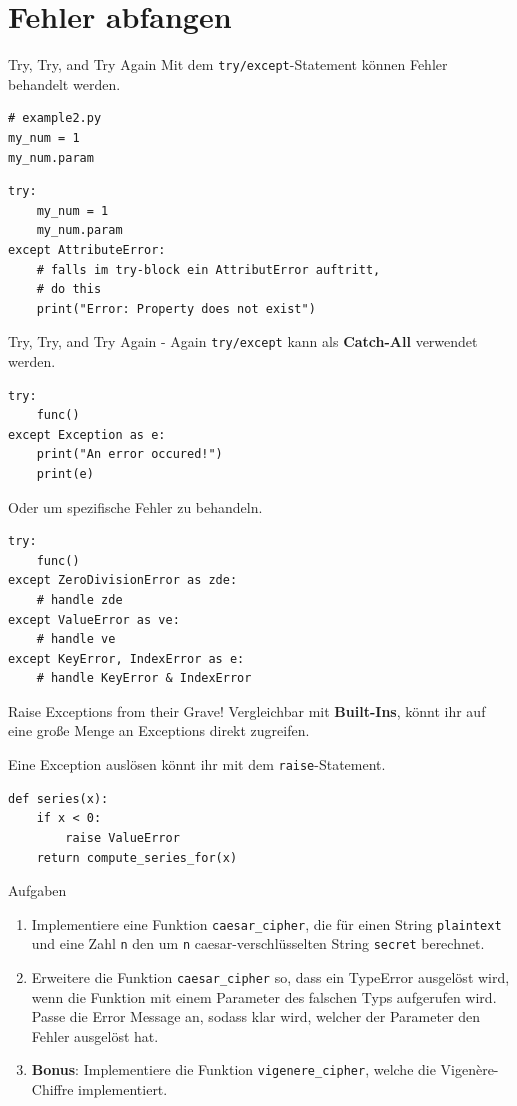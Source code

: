 \section{Fehler abfangen}

\begin{frame}[fragile]{Try, Try, and Try Again}
    Mit dem \texttt{try/except}-Statement können Fehler behandelt werden.
\begin{lstlisting}
# example2.py
my_num = 1
my_num.param
\end{lstlisting}
\begin{lstlisting}
try:
    my_num = 1
    my_num.param
except AttributeError:
    # falls im try-block ein AttributError auftritt,
    # do this
    print("Error: Property does not exist")
\end{lstlisting}
\end{frame}

\begin{frame}[fragile]{Try, Try, and Try Again - Again}
    \texttt{try/except} kann als \textbf{Catch-All} verwendet werden.
\begin{lstlisting}
try:
    func()
except Exception as e:
    print("An error occured!")
    print(e)
\end{lstlisting}
Oder um spezifische Fehler zu behandeln.
\begin{lstlisting}
try:
    func()
except ZeroDivisionError as zde:
    # handle zde
except ValueError as ve:
    # handle ve
except KeyError, IndexError as e:
    # handle KeyError & IndexError
\end{lstlisting}
\end{frame}

\begin{frame}[fragile]{Raise Exceptions from their Grave!}
    Vergleichbar mit \textbf{Built-Ins}, könnt ihr auf eine große Menge an Exceptions direkt zugreifen.

    Eine Exception auslösen könnt ihr mit dem \texttt{raise}-Statement.
\begin{lstlisting}
def series(x):
    if x < 0:
        raise ValueError
    return compute_series_for(x)
\end{lstlisting}
\end{frame}


\begin{frame}[fragile]{Aufgaben}
    \begin{enumerate}
        \item Implementiere eine Funktion \texttt{caesar\_cipher}, die für einen String \texttt{plaintext} und eine Zahl \texttt{n} den um \texttt{n} caesar-verschlüsselten String \texttt{secret} berechnet.
        \item Erweitere die Funktion \texttt{caesar\_cipher} so, dass ein TypeError ausgelöst wird, wenn die Funktion mit einem Parameter des falschen Typs aufgerufen wird. Passe die Error Message an, sodass klar wird, welcher der Parameter den Fehler ausgelöst hat.
        \item \textbf{Bonus}: Implementiere die Funktion \texttt{vigenere\_cipher}, welche die Vigenère-Chiffre implementiert.
    \end{enumerate}
\end{frame}

